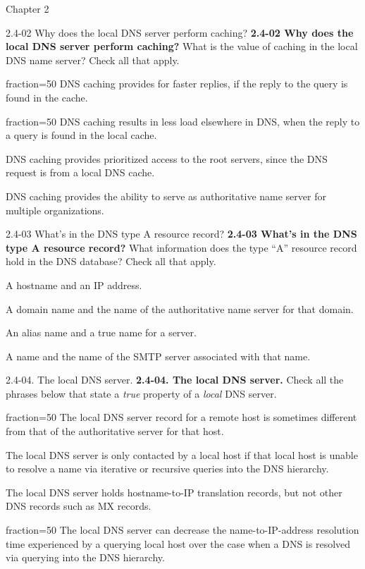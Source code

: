 \documentclass[11pt]{article}
\begin{document}
\begin{quiz}{Chapter 2}
\begin{multi}[points=1,shuffle,multiple]{2.4-02 Why does the local DNS server perform caching?}
\textbf{2.4-02 Why does the local DNS server perform caching?} 
What is the value of caching in the local DNS name server? Check all that apply.

\item[fraction=50] DNS caching provides for faster replies, if the reply to the query is found in the cache.
\item[fraction=50] DNS caching results in less load elsewhere in DNS, when the reply to a query is found in the local cache.
\item DNS caching provides prioritized access to the root servers, since the DNS request is from a local DNS cache.
\item DNS caching provides the ability to serve as authoritative name server for multiple organizations.
\end{multi}

\begin{multi}[points=1,shuffle,multiple]{2.4-03 What's in the DNS type A resource record?}
\textbf{2.4-03 What's in the DNS type A resource record?} 
What information does the type ``A'' resource record hold in the DNS database? Check all that apply.
\item* A hostname and an IP address.
\item A domain name and the name of the authoritative name server for that domain.
\item An alias name and a true name for a server.
\item A name and the name of the SMTP server associated with that name.
\end{multi}

\begin{multi}[points=1,shuffle,multiple]{2.4-04. The local DNS server.}
\textbf{2.4-04. The local DNS server.} 
Check all the phrases below that state a \emph{true} property of a \emph{local} DNS server.
\item[fraction=50] The local DNS server record for a remote host is sometimes different from that of the authoritative server for that host.
\item The local DNS server is only contacted by a local host if that local host is unable to resolve a name via iterative or recursive queries into the DNS hierarchy.
\item The local DNS server holds hostname-to-IP translation records, but not other DNS records such as MX records.
\item[fraction=50] The local DNS server can decrease the name-to-IP-address resolution time experienced by a querying local host over the case when a DNS is resolved via querying into the DNS hierarchy.
\end{multi}


\end{quiz}
\end{document}
